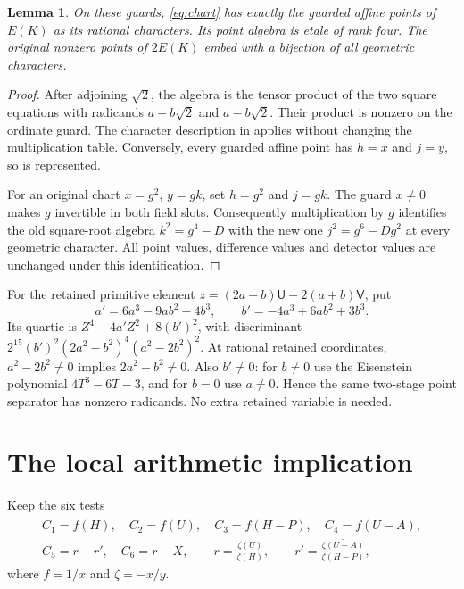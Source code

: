 \documentclass[11pt,a4paper]{article}
\newtheorem{lemma}[theorem]{Lemma}
\begin{document}
\begin{lemma}\label{lem:charts}
On these guards, \eqref{eq:chart} has exactly the guarded affine
points of $E(K)$ as its rational characters. Its point algebra is
etale of rank four. The original nonzero points of $2E(K)$ embed
with a bijection of all geometric characters.
\end{lemma}
\begin{proof}
After adjoining $\sqrt2$, the algebra is the tensor product of the
two square equations with radicands $a+b\sqrt2$ and
$a-b\sqrt2$. Their product is nonzero on the ordinate guard.
The character description in \cite{Unit} applies without changing
the multiplication table. Conversely, every guarded affine point
has $h=x$ and $j=y$, so is represented.

For an original chart $x=g^2$, $y=gk$, set $h=g^2$ and $j=gk$.
The guard $x\ne0$ makes $g$ invertible in both field slots.
Consequently multiplication by $g$ identifies the old square-root
algebra $k^2=g^4-D$ with the new one $j^2=g^6-Dg^2$ at every
geometric character. All point values, difference values and
detector values are unchanged under this identification.
\end{proof}

For the retained primitive element
$z=(2a+b)\mathsf U-2(a+b)\mathsf V$, put
\[
 a'=6a^3-9ab^2-4b^3,\qquad
 b'=-4a^3+6ab^2+3b^3.
\]
Its quartic is $Z^4-4a'Z^2+8(b')^2$, with discriminant
$2^{15}(b')^2(2a^2-b^2)^4(a^2-2b^2)^2$.
At rational retained coordinates, $a^2-2b^2\ne0$ implies
$2a^2-b^2\ne0$. Also $b'\ne0$: for $b\ne0$ use the
Eisenstein polynomial $4T^3-6T-3$, and for $b=0$ use $a\ne0$.
Hence the same two-stage point separator has nonzero radicands.
No extra retained variable is needed.

\section{The local arithmetic implication}
Keep the six tests
\[
\begin{gathered}
 C_1=f(H),\quad C_2=f(U),\quad
 C_3=\overline{f(H-P)},\quad C_4=\overline{f(U-A)},\\
 C_5=r-r',\quad C_6=r-X,\qquad
 r=\frac{\zeta(U)}{\zeta(H)},\qquad
 r'=\overline{\frac{\zeta(U-A)}{\zeta(H-P)}},
\end{gathered}
\]
where $f=1/x$ and $\zeta=-x/y$.
\end{document}

